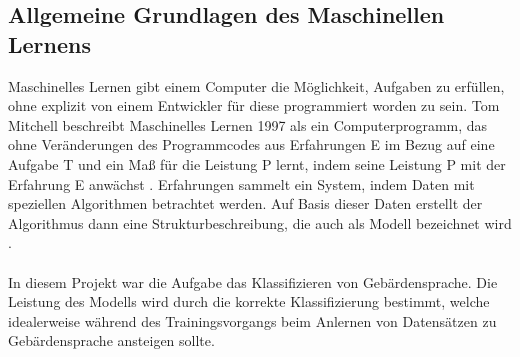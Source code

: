 \documentclass[11pt,bibliography=totocnumbered]{scrartcl}
\begin{document}
\subsection{Allgemeine Grundlagen des Maschinellen Lernens}
Maschinelles Lernen gibt einem Computer die Möglichkeit, Aufgaben zu erfüllen, ohne explizit von einem Entwickler für diese programmiert worden zu sein. Tom Mitchell beschreibt Maschinelles Lernen 1997 als ein Computerprogramm, das ohne Veränderungen des Programmcodes aus Erfahrungen E im Bezug auf eine Aufgabe T und ein Maß für die Leistung P lernt, indem seine Leistung P mit der Erfahrung E anwächst \cite[S. 4]{MACHINE_LEARNING}. Erfahrungen sammelt ein System, indem Daten mit speziellen Algorithmen betrachtet werden. Auf Basis dieser Daten erstellt der Algorithmus dann eine Strukturbeschreibung, die auch als Modell bezeichnet wird \cite[S. 2]{DEEP_LEARNING}.
\\\\
In diesem Projekt war die Aufgabe das Klassifizieren von Gebärdensprache. Die Leistung des Modells wird durch die korrekte Klassifizierung bestimmt, welche idealerweise während des Trainingsvorgangs beim Anlernen von Datensätzen zu Gebärdensprache ansteigen sollte.
\end{document}
